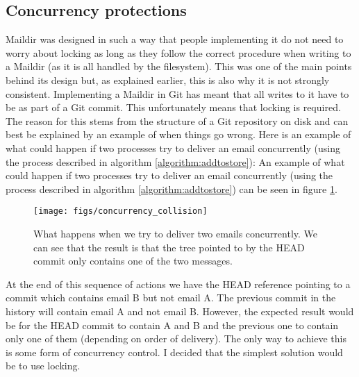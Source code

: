 \subsection{Concurrency protections} \label{section:concurrency}

Maildir was designed in such a way that people implementing it do not need to worry about locking as long as they follow the correct procedure when writing to a Maildir (as it is all handled by the filesystem). This was one of the main points behind its design but, as explained earlier, this is also why it is not strongly consistent. Implementing a Maildir in Git has meant that all writes to it have to be as part of a Git commit. This unfortunately means that locking is required. The reason for this stems from the structure of a Git repository on disk and can best be explained by an example of when things go wrong. Here is an example of what could happen if two processes try to deliver an email concurrently (using the process described in algorithm \ref{algorithm:addtostore}):
An example of what could happen if two processes try to deliver an email concurrently (using the process described in algorithm \ref{algorithm:addtostore}) can be seen in figure \ref{fig:concurrentdeliver}.

\begin{figure}
  \center
  \texttt{[image: figs/concurrency\_collision]}
  \caption{What happens when we try to deliver two emails concurrently. We can see that the result is that the tree pointed to by the HEAD commit only contains one of the two messages.}
  \label{fig:concurrentdeliver}
\end{figure}

At the end of this sequence of actions we have the HEAD reference pointing to a commit which contains email B but not email A. The previous commit in the history will contain email A and not email B. However, the expected result would be for the HEAD commit to contain A and B and the previous one to contain only one of them (depending on order of delivery). The only way to achieve this is some form of concurrency control. I decided that the simplest solution would be to use locking.

